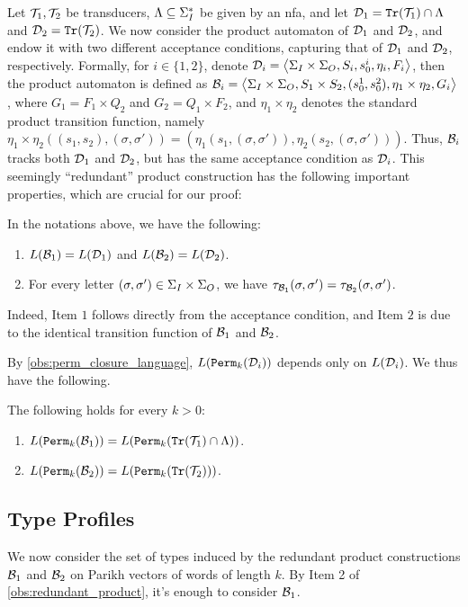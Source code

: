 Let $\mathcal{T}_1,\mathcal{T}_2$ be transducers, $\Lambda\subseteq \Sigma_{I}^*$ be given by an \gls{nfa}, and let $\mathcal{D}_1={\mathtt{Tr}}(\mathcal{T}_1)\cap \Lambda$ and $\mathcal{D}_2={\mathtt{Tr}}(\mathcal{T}_2)$. 
We now consider the product automaton of $\mathcal{D}_1$ and $\mathcal{D}_2$, and endow it with two different acceptance conditions, capturing that of $\mathcal{D}_1$ and $\mathcal{D}_2$, respectively. Formally, for $i\in \{1,2\}$, denote $\mathcal{D}_i=\left< \Sigma_{I}\times\Sigma_{O},S_i,s^i_0,\eta_i,F_i\right>$, then the product automaton is defined as $\mathcal{B}_i=\left< \Sigma_{I}\times\Sigma_{O},S_1\times S_2,(s^1_0,s^2_0),\eta_1\times \eta_2,G_i\right>$, where $G_1=F_1\times Q_2$ and $G_2=Q_1\times F_2$, and $\eta_1\times \eta_2$ denotes the standard product transition function, namely $\eta_1\times\eta_2((s_1,s_2),(\sigma,\sigma'))=(\eta_1(s_1,(\sigma,\sigma')),\eta_2(s_2,(\sigma,\sigma')))$. Thus, $\mathcal{B}_i$ tracks both $\mathcal{D}_1$ and $\mathcal{D}_2$, but has the same acceptance condition as $\mathcal{D}_i$. This seemingly ``redundant'' product construction has the following important properties, which are crucial for our proof:
\begin{observation}
	\label{obs:redundant_product}
 In the notations above, we have the following:
	\begin{enumerate}
		\item $L(\mathcal{B}_1)=L(\mathcal{D}_1)$ and $L(\mathcal{B}_2)=L(\mathcal{D}_2)$.
		\item For every letter $(\sigma,\sigma')\in \Sigma_{I}\times\Sigma_{O}$, we have $\tau_{\mathcal{B}_1}(\sigma,\sigma')=\tau_{\mathcal{B}_2}(\sigma,\sigma')$.
	\end{enumerate}
	\end{observation}
	
Indeed, Item $1$ follows directly from the acceptance condition, and Item $2$ is due to the identical transition function of $\mathcal{B}_1$ and $\mathcal{B}_2$.

By \autoref{obs:perm_closure_language}, $L({\mathtt{Perm}}_k(\mathcal{D}_i))$ depends only on $L(\mathcal{D}_i)$. We thus have the following.
\begin{observation}
	\label{obs:redundant_product_for_perm_automata}
	 The following holds for every $k>0$:
	  \begin{enumerate}
	      \item $L({\mathtt{Perm}}_k(\mathcal{B}_1))=L({\mathtt{Perm}}_k({\mathtt{Tr}}(\mathcal{T}_1)\cap \Lambda))$.
	      \item $L({\mathtt{Perm}}_k(\mathcal{B}_2))=L({\mathtt{Perm}}_k({\mathtt{Tr}}(\mathcal{T}_2)))$.
	  \end{enumerate}
	\end{observation}

\subsection*{Type Profiles}
We now consider the set of types induced by the redundant product constructions $\mathcal{B}_1$ and $\mathcal{B}_2$ on Parikh vectors of words of length $k$. By Item 2 of \autoref{obs:redundant_product}, it's enough to consider $\mathcal{B}_1$. 

